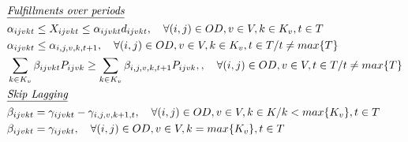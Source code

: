 \begin{align}
	 & \textit{\underline{Fulfillments over periods} }   \notag                                                                                                                                                                                                                                    \\
	 & \alpha_{ijvkt} \leq X_{ijvkt} \leq \alpha_{ijvkt}d_{ijvkt}, \quad   \forall(i,j) \in OD, v \in V, k \in K_v, t \in T                                                                                                  \label{eq: m1_binaria_alpha}                                                                               \\
	 & \alpha_{ijvkt} \leq \alpha_{i,j,v,k,t+1}, \quad   \forall(i,j) \in OD, v \in V, k \in K_v, t \in T/ t \neq max\{T\}                                                                                                   \label{eq: m1_assig_last_periodo}                                                                              \\
	 & \sum_{k \in K_v}\beta_{ijvkt}P_{ijvk} \geq \sum_{k \in K_v}\beta_{i,j,v,k,t+1}P_{ijvk},  , \quad   \forall(i,j) \in OD, v \in V, t \in T/ t \neq max\{T\}                                                              \label{eq: m1_fulfill_periodo}                          \\
	 & \textit{\underline{Skip Lagging}}    \notag                                                                                                                                                                                                                                                  \\
	 & \beta_{ijvkt} = \gamma_{ijvkt} - \gamma_{i,j,v,k+1,t}, \quad \forall (i,j) \in OD, v \in V, k \in K /k < max\{K_v\}, t\in T                                                                                               \label{eq: m1_binaria_Beta}             \\                                                                   
	 & \beta_{ijvkt} = \gamma_{ijvkt}, \quad   \forall(i,j) \in OD, v \in V, k = max\{K_v\}, t \in T                                                                                                                         \label{eq: m1_binaria_Beta_last}                                                                           \\

\end{align}
